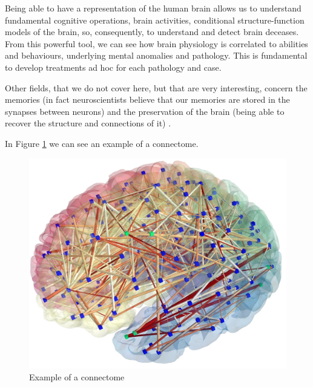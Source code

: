 Being able to have a representation of the human brain allows us to understand fundamental cognitive operations, brain activities, conditional structure-function models of the brain, so, consequently, to understand and detect brain deceases. From this powerful tool, we can see how brain physiology is correlated to abilities and behaviours, underlying mental anomalies and pathology. This is fundamental to develop treatments ad hoc for each pathology and case. 

Other fields, that we do not cover here, but that are very interesting, concern the memories (in fact neuroscientists believe that our memories are stored in the synapses between neurons) and the preservation of the brain (being able to recover the structure and connections of it) \cite{preservation}.

In Figure \ref{fig:diagram3} we can see an example of a connectome.

\begin{figure}[htbp]
	\centering
	\includegraphics[scale=0.08]{Immagini/cervello.jpg}
	\caption{Example of a connectome}
	\label{fig:diagram3}
\end{figure}



